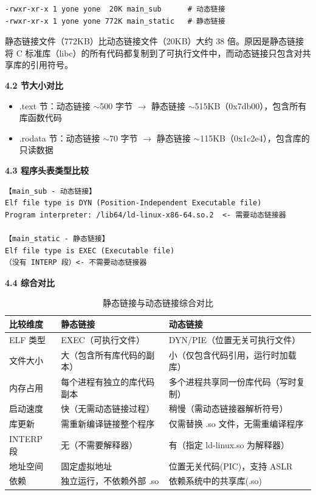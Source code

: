 \documentclass[12pt,a4paper]{ctexart}
\begin{document}
\begin{lstlisting}
-rwxr-xr-x 1 yone yone  20K main_sub      # 动态链接
-rwxr-xr-x 1 yone yone 772K main_static   # 静态链接
\end{lstlisting}

静态链接文件（772KB）比动态链接文件（20KB）大约 38 倍。原因是静态链接将 C 标准库（libc）的所有代码都复制到了可执行文件中，而动态链接只包含对共享库的引用符号。

\textbf{4.2 节大小对比}

\begin{itemize}[nosep]
    \item .text 节：动态链接 $\sim$500 字节 $\to$ 静态链接 $\sim$515KB（0x7db00），包含所有库函数代码
    \item .rodata 节：动态链接 $\sim$70 字节 $\to$ 静态链接 $\sim$115KB（0x1c2e4），包含库的只读数据
\end{itemize}

\textbf{4.3 程序头表类型比较}

\begin{lstlisting}
【main_sub - 动态链接】
Elf file type is DYN (Position-Independent Executable file)
Program interpreter: /lib64/ld-linux-x86-64.so.2  <- 需要动态链接器

【main_static - 静态链接】
Elf file type is EXEC (Executable file)
（没有 INTERP 段）<- 不需要动态链接器
\end{lstlisting}

\textbf{4.4 综合对比}

\begin{table}[h]
\centering
\caption{静态链接与动态链接综合对比}
\begin{tabular}{|p{3cm}|p{5.5cm}|p{5.5cm}|}
\hline
\textbf{比较维度} & \textbf{静态链接} & \textbf{动态链接} \\
\hline
ELF 类型 & EXEC（可执行文件） & DYN/PIE（位置无关可执行文件） \\
\hline
文件大小 & 大（包含所有库代码的副本） & 小（仅包含代码引用，运行时加载库） \\
\hline
内存占用 & 每个进程有独立的库代码副本 & 多个进程共享同一份库代码（写时复制） \\
\hline
启动速度 & 快（无需动态链接过程） & 稍慢（需动态链接器解析符号） \\
\hline
库更新 & 需重新编译链接整个程序 & 仅需替换 .so 文件，无需重编译程序 \\
\hline
INTERP 段 & 无（不需要解释器） & 有（指定 ld-linux.so 为解释器） \\
\hline
地址空间 & 固定虚拟地址 & 位置无关代码(PIC)，支持 ASLR \\
\hline
依赖 & 独立运行，不依赖外部 .so & 依赖系统中的共享库(.so) \\
\hline
\end{tabular}
\end{table}
\end{document}
